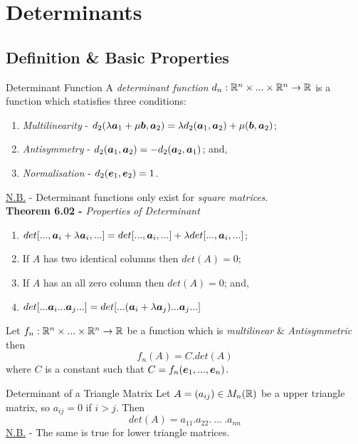 \documentclass[11pt,a4paper]{article}
\begin{document}
\section{Determinants}

\subsection{Definition \& Basic Properties}

\subtitle{Definition 6.01 - }{Determinant Function}
A \textit{determinant function} $d_n : \mathbb{R}^n \times ... \times \mathbb{R}^n \to \mathbb{R}$ is a function which statisfies three conditions:
\begin{enumerate}[label=\roman*)]
  \item \textit{Multilinearity} - $d_2(\lambda\boldsymbol{a}_1 + \mu\boldsymbol{b}, \boldsymbol{a}_2) = \lambda d_2(\boldsymbol{a}_1, \boldsymbol{a}_2) + \mu(\boldsymbol{b}, \boldsymbol{a}_2)$;
  \item \textit{Antisymmetry} - $d_2(\boldsymbol{a}_1, \boldsymbol{a}_2) = -d_2(\boldsymbol{a}_2, \boldsymbol{a}_1)$; and,
  \item \textit{Normalisation} - $d_2(\boldsymbol{e}_1, \boldsymbol{e}_2) = 1$.
\end{enumerate}
\underline{N.B.} - Determinant functions only exist for \textit{square matrices}. \\

\textbf{Theorem 6.02 - }\textit{Properties of Determinant}
\begin{enumerate}[label=\roman*)]
  \item $det[ ... , \boldsymbol{a}_i + \lambda\boldsymbol{a}_i , ...] = det[ ... , \boldsymbol{a}_i , ...] + \lambda det[ ... , \boldsymbol{a}_i , ...]$;
  \item If $A$ has two identical columns then $det(A) = 0$;
  \item If $A$ has an all zero column then $det(A) = 0$; and,
  \item $det[... \boldsymbol{a}_i ... \boldsymbol{a}_j ...] = det[... (\boldsymbol{a}_i + \lambda\boldsymbol{a}_j) ... \boldsymbol{a}_j ...]$\\
\end{enumerate}

\subtitle{Theorem 6.03}{}
Let $f_n : \mathbb{R}^n \times ... \times \mathbb{R}^n \to \mathbb{R}$ be a function which is \textit{multilinear} \& \textit{Antisymmetric} then $$f_n(A) = C.det(A)$$
where $C$ is a constant such that $C = f_n(\boldsymbol{e}_1, ... , \boldsymbol{e}_n)$. \\

\subtitle{Theorem 6.04 - }{Determinant of a Triangle Matrix}
Let $A = (a_{ij}) \in M_{n}(\mathbb{R})$ be a upper triangle matrix, so $a_{ij} = 0$ if $i > j$. Then $$det(A) = a_{11}.a_{22}.\ ...\ .a_{nn}$$
\underline{N.B.} - The same is true for lower triangle matrices. \\
\end{document}
